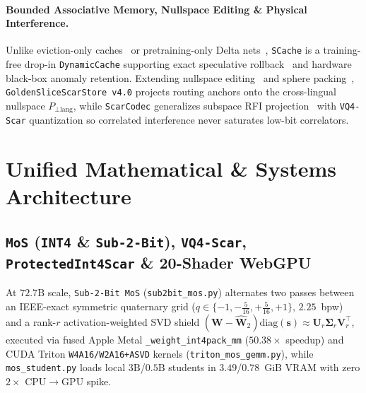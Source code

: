 \documentclass[10pt,twocolumn]{article}
\begin{document}
\paragraph{Bounded Associative Memory, Nullspace Editing \& Physical Interference.}
Unlike eviction-only caches~\citep{xiao2024efficient,zhang2023h2o} or pretraining-only Delta nets~\citep{widrow1960adaptive,schlag2021linear,yang2024parallelizing}, \texttt{SCache} is a training-free drop-in \texttt{DynamicCache} supporting exact speculative rollback~\citep{leviathan2023fast} and hardware black-box anomaly retention. Extending nullspace editing~\citep{meng2022locating,fang2025alphaedit} and sphere packing~\citep{kabatiansky1978bounds}, \texttt{GoldenSliceScarStore v4.0} projects routing anchors onto the cross-lingual nullspace $P_{\perp\text{lang}}$, while \texttt{ScarCodec} generalizes subspace RFI projection~\citep{leshem2000multichannel} with \texttt{VQ4-Scar} quantization so correlated interference never saturates low-bit correlators.

\section{Unified Mathematical \& Systems Architecture}

\subsection{\texttt{MoS} (\texttt{INT4} \& \texttt{Sub-2-Bit}), \texttt{VQ4-Scar}, \texttt{ProtectedInt4Scar} \& 20-Shader WebGPU}
At $72.7\text{B}$ scale, \texttt{Sub-2-Bit MoS} (\texttt{sub2bit\_mos.py}) alternates two passes between an IEEE-exact symmetric quaternary grid ($q \in \{-1, -\tfrac{5}{16}, +\tfrac{5}{16}, +1\}$, $2.25$~bpw) and a rank-$r$ activation-weighted SVD shield $(\mathbf{W} - \widehat{\mathbf{W}}_2)\mathrm{diag}(\mathbf{s}) \approx \mathbf{U}_r \boldsymbol{\Sigma}_r \mathbf{V}_r^\top$, executed via fused Apple Metal \texttt{\_weight\_int4pack\_mm} ($50.38\times$ speedup) and CUDA Triton \texttt{W4A16/W2A16+ASVD} kernels (\texttt{triton\_mos\_gemm.py}), while \texttt{mos\_student.py} loads local $3\text{B}$/$0.5\text{B}$ students in $3.49$/$0.78$~GiB VRAM with zero $2\times$ CPU$\to$GPU spike.
\end{document}
